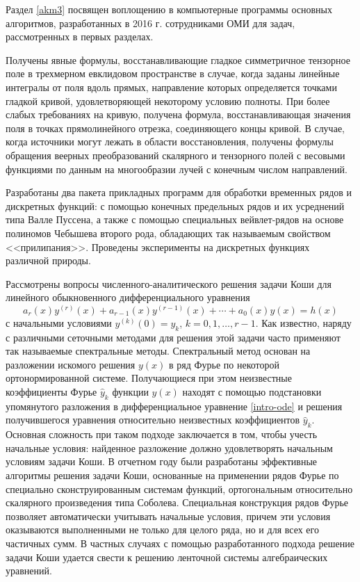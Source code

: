 Раздел \ref{akm3} посвящен воплощению в компьютерные программы основных алгоритмов, разработанных в 2016 г. сотрудниками ОМИ для задач, рассмотренных в первых разделах.


Получены явные формулы, восстанавливающие гладкое симметричное тензорное поле в трехмерном евклидовом пространстве в случае, когда заданы линейные интегралы от поля вдоль прямых, направление которых определяется точками гладкой кривой, удовлетворяющей некоторому условию полноты. При более слабых требованиях на кривую, получена формула, восстанавливающая значения поля в точках прямолинейного отрезка, соединяющего концы кривой. В случае, когда источники могут лежать в области восстановления, получены формулы обращения веерных преобразований скалярного и тензорного полей с весовыми функциями по данным на многообразии лучей с конечным числом направлений.

Разработаны два пакета прикладных программ для обработки временных рядов и дискретных функций: с помощью конечных предельных рядов и их усреднений типа Валле Пуссена, а также с помощью специальных вейвлет-рядов на основе полиномов Чебышева второго рода, обладающих так называемым свойством <<прилипания>>. Проведены эксперименты на дискретных функциях различной природы.

Рассмотрены вопросы численного-аналитического решения задачи Коши для линейного обыкновенного дифференциального уравнения
\begin{equation}\label{intro-ode}
 a_r(x)y^{(r)}(x)+a_{r-1}(x)y^{(r-1)}(x)+\cdots+a_0(x)y(x)=h(x)
 \end{equation}
с начальными условиями $y^{(k)}(0)=y_k$, $k=0,1,\ldots,r-1$.  Как известно, наряду с различными сеточными методами для решения этой задачи часто применяют так называемые спектральные методы. Спектральный метод основан на разложении искомого решения $y(x)$ в ряд Фурье по некоторой ортонормированной системе. Получающиеся при этом неизвестные коэффициенты Фурье $\hat{y}_k$ функции $y(x)$ находят с помощью подстановки упомянутого разложения в дифференциальное уравнение \eqref{intro-ode} и решения получившегося уравнения относительно неизвестных коэффициентов $\hat{y}_k$. Основная сложность при таком подходе заключается в том, чтобы учесть начальные условия: найденное разложение должно удовлетворять начальным условиям задачи Коши. В отчетном году были разработаны эффективные алгоритмы решения задачи Коши, основанные на применении рядов Фурье по специально сконструированным системам функций, ортогональным относительно скалярного произведения типа Соболева. Специальная конструкция рядов Фурье позволяет автоматически учитывать начальные условия, причем эти условия оказываются выполненными не только для целого ряда, но и для всех его частичных сумм. В частных случаях с помощью разработанного подхода решение задачи Коши удается свести к решению ленточной системы алгебраических уравнений.

